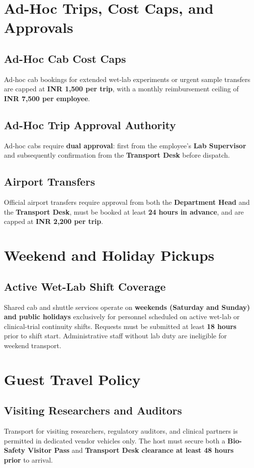 \documentclass[11pt,a4paper]{article}
\begin{document}
\section{Ad-Hoc Trips, Cost Caps, and Approvals}
\subsection{Ad-Hoc Cab Cost Caps}
Ad-hoc cab bookings for extended wet-lab experiments or urgent sample transfers are capped at \textbf{INR 1,500 per trip}, with a monthly reimbursement ceiling of \textbf{INR 7,500 per employee}.

\subsection{Ad-Hoc Trip Approval Authority}
Ad-hoc cabs require \textbf{dual approval}: first from the employee's \textbf{Lab Supervisor} and subsequently confirmation from the \textbf{Transport Desk} before dispatch.

\subsection{Airport Transfers}
Official airport transfers require approval from both the \textbf{Department Head} and the \textbf{Transport Desk}, must be booked at least \textbf{24 hours in advance}, and are capped at \textbf{INR 2,200 per trip}.

\section{Weekend and Holiday Pickups}
\subsection{Active Wet-Lab Shift Coverage}
Shared cab and shuttle services operate on \textbf{weekends (Saturday and Sunday) and public holidays} exclusively for personnel scheduled on active wet-lab or clinical-trial continuity shifts. Requests must be submitted at least \textbf{18 hours} prior to shift start. Administrative staff without lab duty are ineligible for weekend transport.

\section{Guest Travel Policy}
\subsection{Visiting Researchers and Auditors}
Transport for visiting researchers, regulatory auditors, and clinical partners is permitted in dedicated vendor vehicles only. The host must secure both a \textbf{Bio-Safety Visitor Pass} and \textbf{Transport Desk clearance at least 48 hours prior} to arrival.
\end{document}
